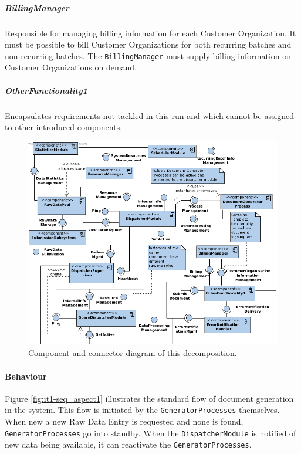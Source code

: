 \documentclass[a4paper,10pt]{article}
\begin{document}
\subparagraph{BillingManager}
Responsible for managing billing information for each Customer Organization. It must be possible to bill Customer Organizations for both recurring batches and non-recurring batches. The \texttt{BillingManager} must supply billing information on Customer Organizations on demand.

\subparagraph{OtherFunctionality1}
Encapsulates requirements not tackled in this run and which cannot be
assigned to other introduced components.

\begin{figure}[!htp]
    \centering
    \includegraphics[width=\textwidth]{comp_diag_1.png}
    \caption{Component-and-connector diagram of this decomposition.}\label{fig:it1-cc_main}
\end{figure}

\paragraph{Behaviour}
Figure \ref{fig:it1-seq_aspect1} illustrates the standard flow of document generation in the system. This flow is initiated by the \texttt{GeneratorProcesses} themselves. When new a new Raw Data Entry is requested and none is found, \texttt{GeneratorProcesses} go into standby. When the \texttt{DispatcherModule} is notified of new data being available, it can reactivate the \texttt{GeneratorProcesses}.
\end{document}
